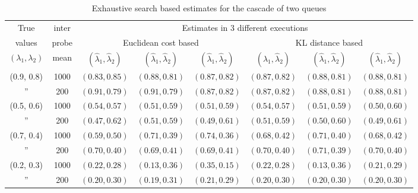 \documentclass[11pt]{article}
\begin{document}
{\footnotesize{
\begin{table*}
  \caption{Exhaustive search based estimates for the cascade of two
    queues}
  \label{tbl:two-queue-exhaustive}
  \begin{center}
  \begin{tabular}{||c||c||c|c|c||c|c|c||}
    \hline \hline
    True & inter &
    \multicolumn{6}{|c||}{Estimates in 3 different executions}\\
    \cline{3-8}
    values & probe & \multicolumn{3}{|c||}{Euclidean cost based}& 
    \multicolumn{3}{|c||}{KL distance based} \\
    \cline{3-8}
    $(\lambda_1, \lambda_2)$ & mean & $(\hat{\lambda}_1, \hat{\lambda}_2)$
    & $(\hat{\lambda}_1, \hat{\lambda}_2)$ & $(\hat{\lambda}_1, \hat{\lambda}_2)$
    & $(\hat{\lambda}_1, \hat{\lambda}_2)$
    & $(\hat{\lambda}_1, \hat{\lambda}_2)$ & $(\hat{\lambda}_1, \hat{\lambda}_2)$\\
    \hline \hline
    (0.9, 0.8) & 1000 & $(0.83, 0.85)$ & $(0.88, 0.81)$ & $(0.87, 0.82)$ & $(0.87, 0.82)$ & $(0.88, 0.81)$ & $(0.88, 0.81)$\\ \hline
    '' &  200  & $(0.91, 0.79)$ & $(0.91, 0.79)$ & $(0.87, 0.82)$ & $(0.87, 0.82)$ & $(0.88, 0.81)$ & $(0.88, 0.81)$\\\hline
    (0.5, 0.6) & 1000 & $(0.54, 0.57)$ & $(0.51, 0.59)$ & $(0.51, 0.59)$ & $(0.54, 0.57)$ & $(0.51, 0.59)$ & $(0.50, 0.60)$ \\ \hline
    '' &  200 & $(0.47, 0.62)$ & $(0.51, 0.59)$ &  $(0.49, 0.61)$ & $(0.51, 0.59)$ & $(0.50, 0.60)$ & $(0.49, 0.61)$ \\ \hline
    (0.7, 0.4) & 1000 & $(0.59, 0.50)$ & $(0.71, 0.39)$ &$(0.74, 0.36)$&
    $(0.68, 0.42)$ & $(0.71, 0.40)$ & $(0.68, 0.42)$ \\\hline
    '' &  200 & $(0.70, 0.40)$ & $(0.69, 0.41)$ & $(0.69, 0.41)$ & $(0.70, 0.40)$ & $(0.71, 0.39)$ & $(0.70, 0.40)$ \\ \hline
    (0.2, 0.3) & 1000 & $(0.22, 0.28)$ & $(0.13, 0.36)$ & $(0.35, 0.15)$ & $(0.22, 0.28)$ & $(0.13, 0.36)$ & $(0.21, 0.29)$ \\ \hline
    '' &  200 & $(0.20, 0.30)$ & $(0.19, 0.31)$ &$(0.21, 0.29)$& 
    $(0.20, 0.30)$ &$(0.20, 0.30)$ & $(0.20, 0.30)$ \\\hline
    \hline
  \end{tabular}
  \end{center}
\end{table*}
}}
\end{document}
